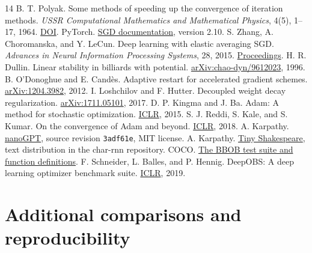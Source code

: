 \documentclass[10pt,letterpaper]{article}
\begin{document}
\clearpage
\begin{thebibliography}{14}
\setlength{\itemsep}{0pt}
 B. T. Polyak. Some methods of speeding up the convergence of iteration methods. \emph{USSR Computational Mathematics and Mathematical Physics}, 4(5), 1--17, 1964. \href{https://doi.org/10.1016/0041-5553(64)90137-5}{DOI}.
 PyTorch. \href{https://docs.pytorch.org/docs/2.10/generated/torch.optim.SGD.html}{SGD documentation}, version 2.10.
 S. Zhang, A. Choromanska, and Y. LeCun. Deep learning with elastic averaging SGD. \emph{Advances in Neural Information Processing Systems}, 28, 2015. \href{https://proceedings.neurips.cc/paper/2015/hash/d18f655c3fce66ca401d5f38b48c89af-Abstract.html}{Proceedings}.
 H. R. Dullin. Linear stability in billiards with potential. \href{https://arxiv.org/abs/chao-dyn/9612023}{arXiv:chao-dyn/9612023}, 1996.
 B. O'Donoghue and E. Cand\`es. Adaptive restart for accelerated gradient schemes. \href{https://arxiv.org/abs/1204.3982}{arXiv:1204.3982}, 2012.
 I. Loshchilov and F. Hutter. Decoupled weight decay regularization. \href{https://arxiv.org/abs/1711.05101}{arXiv:1711.05101}, 2017.
 D. P. Kingma and J. Ba. Adam: A method for stochastic optimization. \href{https://arxiv.org/abs/1412.6980}{ICLR}, 2015.
 S. J. Reddi, S. Kale, and S. Kumar. On the convergence of Adam and beyond. \href{https://arxiv.org/abs/1904.09237}{ICLR}, 2018.
 A. Karpathy. \href{https://github.com/karpathy/nanoGPT/tree/3adf61e154c3fe3fca428ad6bc3818b27a3b8291}{nanoGPT}, source revision \texttt{3adf61e}, MIT license.
 A. Karpathy. \href{https://github.com/karpathy/char-rnn/blob/master/data/tinyshakespeare/input.txt}{Tiny Shakespeare}, text distribution in the char-rnn repository.
 COCO. \href{https://coco-platform.org/testsuites/bbob/overview.html}{The BBOB test suite and function definitions}.
 F. Schneider, L. Balles, and P. Hennig. DeepOBS: A deep learning optimizer benchmark suite. \href{https://arxiv.org/abs/1903.05499}{ICLR}, 2019.
\end{thebibliography}
\appendix
\fontsize{9.5}{11.4}\selectfont
\setlength{\parskip}{3pt}
\setlength{\abovedisplayskip}{6pt plus 2pt minus 2pt}
\setlength{\belowdisplayskip}{6pt plus 2pt minus 2pt}
\setlength{\abovedisplayshortskip}{3pt plus 1pt}
\setlength{\belowdisplayshortskip}{4pt plus 1pt minus 1pt}
\section{Additional comparisons and reproducibility}
\label{app:details}
\end{document}
